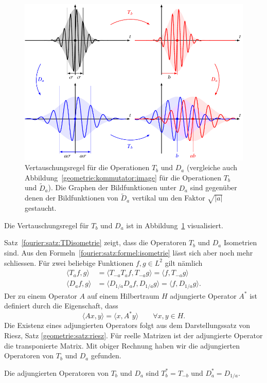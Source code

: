 \begin{figure}
\centering
\includegraphics{chapters/2-fourier/images/kommutatorD.pdf}
\caption{Vertauschungsregel für die Operationen $T_b$ und $D_a$
(vergleiche auch Abbildung~\ref{geometrie:kommutator:image} für
die Operationen $T_b$ und $\tilde{D}_a$).
Die Graphen der Bildfunktionen unter $D_a$ sind gegenüber denen der
Bildfunktionen von $\tilde{D}_a$ vertikal um den Faktor $\sqrt{|a|}$
gestaucht.
\label{geometrie:kommutatorD:image}}
\end{figure}

Die Vertauschungsregel für $T_b$ und $D_a$ ist in
Abbildung~\ref{geometrie:kommutatorD:image} visualisiert.
%

Satz~\ref{fourier:satz:TDisometrie} zeigt, dass die Operatoren $T_b$
und $D_a$ Isometrien sind.
Aus den Formeln~\eqref{fourier:satz:formel:isometrie} lässt sich aber
noch mehr schliessen.
Für zwei beliebige Funktionen $f,g\in L^2$ gilt nämlich
\begin{align*}
\langle T_af,g\rangle
&=
\langle T_{-a}T_af,T_{-a}g\rangle
=
\langle f,T_{-a}g\rangle
\\
\langle D_af,g\rangle
&=
\langle D_{1/a}D_af,D_{1/a}g\rangle
=
\langle f,D_{1/a}g\rangle.
\end{align*}
Der zu einem Operator $A$ auf einem Hilbertraum $H$ adjungierte Operator
%
$A^*$ ist definiert durch die Eigenschaft, dass
\[
\langle Ax,y\rangle = \langle x,A^*y\rangle
\qquad
\forall x,y\in H.
\]
Die Existenz eines adjungierten Operators folgt aus dem Darstellungssatz
von Riesz, Satz \ref{geometrie:satz:riesz}.
Für reelle Matrizen ist der adjungierte Operator die transponierte Matrix.
Mit obiger Rechnung haben wir die adjungierten Operatoren von $T_b$ und $D_a$
gefunden.

\begin{satz}
\label{fourier:satz:adjungierte}
Die adjungierten Operatoren von $T_b$ und $D_a$ sind
$T_b^* = T_{-b}$ und $D_a^*=D_{1/a}$.
\end{satz}



